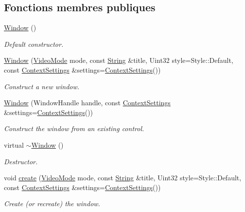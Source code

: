 \subsection*{Fonctions membres publiques}
\begin{DoxyCompactItemize}
\item 
\hyperlink{classsf_1_1Window_a5359122166b4dc492c3d25caf08ccfc4}{Window} ()
\begin{DoxyCompactList}\small\item\em Default constructor. \end{DoxyCompactList}\item 
\hyperlink{classsf_1_1Window_a1bee771baecbae6d357871929dc042a2}{Window} (\hyperlink{classsf_1_1VideoMode}{Video\+Mode} mode, const \hyperlink{classsf_1_1String}{String} \&title, Uint32 style=Style\+::\+Default, const \hyperlink{structsf_1_1ContextSettings}{Context\+Settings} \&settings=\hyperlink{structsf_1_1ContextSettings}{Context\+Settings}())
\begin{DoxyCompactList}\small\item\em Construct a new window. \end{DoxyCompactList}\item 
\hyperlink{classsf_1_1Window_a6d60912633bff9d33cf3ade4e0201de4}{Window} (Window\+Handle handle, const \hyperlink{structsf_1_1ContextSettings}{Context\+Settings} \&settings=\hyperlink{structsf_1_1ContextSettings}{Context\+Settings}())
\begin{DoxyCompactList}\small\item\em Construct the window from an existing control. \end{DoxyCompactList}\item 
virtual \hyperlink{classsf_1_1Window_ac30eb6ea5f5594204944d09d4bd69a97}{$\sim$\+Window} ()
\begin{DoxyCompactList}\small\item\em Destructor. \end{DoxyCompactList}\item 
void \hyperlink{classsf_1_1Window_a30e6edf2162f8dbff61023b9de5d961d}{create} (\hyperlink{classsf_1_1VideoMode}{Video\+Mode} mode, const \hyperlink{classsf_1_1String}{String} \&title, Uint32 style=Style\+::\+Default, const \hyperlink{structsf_1_1ContextSettings}{Context\+Settings} \&settings=\hyperlink{structsf_1_1ContextSettings}{Context\+Settings}())
\begin{DoxyCompactList}\small\item\em Create (or recreate) the window. \end{DoxyCompactList}\item 

\end{DoxyCompactItemize}
